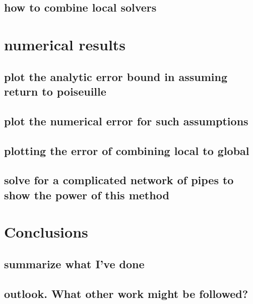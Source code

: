 \documentclass[11pt]{article}
\newtheorem[L]{thm}{Theorem}[section]
\begin{document}
\subsection{how to combine local solvers}

\section{numerical results}

\subsection{plot the analytic error bound in assuming return to poiseuille}
\subsection{plot the numerical error for such assumptions}
\subsection{plotting the error of combining local to global}
\subsection{solve for a complicated network of pipes to show the power of this method}

\section{Conclusions}
\subsection{summarize what I've done}
\subsection{outlook. What other work might be followed?}
\end{document}

